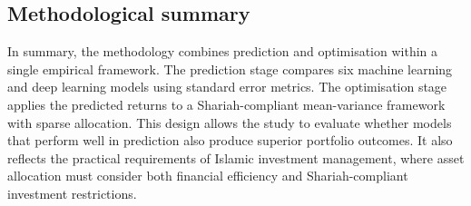 \subsection{Methodological summary}

In summary, the methodology combines prediction and optimisation within a single empirical framework. The prediction stage compares six machine learning and deep learning models using standard error metrics. The optimisation stage applies the predicted returns to a Shariah-compliant mean-variance framework with sparse allocation. This design allows the study to evaluate whether models that perform well in prediction also produce superior portfolio outcomes. It also reflects the practical requirements of Islamic investment management, where asset allocation must consider both financial efficiency and Shariah-compliant investment restrictions.
